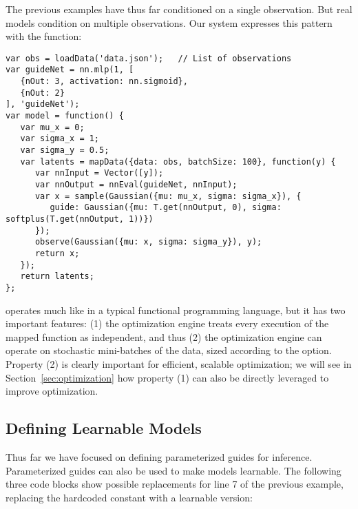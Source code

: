 The previous examples have thus far conditioned on a single observation. But real models condition on multiple observations. Our system expresses this pattern with the  function:
\begin{lstlisting}
var obs = loadData('data.json');   // List of observations
var guideNet = nn.mlp(1, [
   {nOut: 3, activation: nn.sigmoid},
   {nOut: 2}
], 'guideNet');
var model = function() {
   var mu_x = 0;
   var sigma_x = 1;
   var sigma_y = 0.5;
   var latents = mapData({data: obs, batchSize: 100}, function(y) {
      var nnInput = Vector([y]);
      var nnOutput = nnEval(guideNet, nnInput);
      var x = sample(Gaussian({mu: mu_x, sigma: sigma_x}), {
         guide: Gaussian({mu: T.get(nnOutput, 0), sigma: softplus(T.get(nnOutput, 1))})
      });
      observe(Gaussian({mu: x, sigma: sigma_y}), y);
      return x;
   });
   return latents;
};
\end{lstlisting}
 operates much like  in a typical functional programming language, but it has two important features: (1) the optimization engine treats every execution of the mapped function as independent, and thus (2) the optimization engine can operate on stochastic mini-batches of the data, sized according to the  option.
Property (2) is clearly important for efficient, scalable optimization; we will see in Section~\ref{sec:optimization} how property (1) can also be directly leveraged to improve optimization.


\subsection{Defining Learnable Models}

Thus far we have focused on defining parameterized guides for inference.
Parameterized guides can also be used to make models learnable.
The following three code blocks show possible replacements for line 7 of the previous example, replacing the hardcoded constant  with a learnable version:



